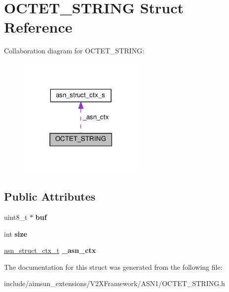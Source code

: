 \hypertarget{structOCTET__STRING}{}\section{O\+C\+T\+E\+T\+\_\+\+S\+T\+R\+I\+NG Struct Reference}
\label{structOCTET__STRING}


Collaboration diagram for O\+C\+T\+E\+T\+\_\+\+S\+T\+R\+I\+NG\+:\nopagebreak
\begin{figure}[H]
\begin{center}
\leavevmode
\includegraphics[width=174pt]{structOCTET__STRING__coll__graph}
\end{center}
\end{figure}
\subsection*{Public Attributes}
\begin{DoxyCompactItemize}
\item 
uint8\+\_\+t $\ast$ {\bfseries buf}\hypertarget{structOCTET__STRING_a38563fa0e3eaf7a3892ba84cc7333a03}{}\label{structOCTET__STRING_a38563fa0e3eaf7a3892ba84cc7333a03}

\item 
int {\bfseries size}\hypertarget{structOCTET__STRING_a08c8ec216120a4ffc21e4d5b4461c129}{}\label{structOCTET__STRING_a08c8ec216120a4ffc21e4d5b4461c129}

\item 
\hyperlink{structasn__struct__ctx__s}{asn\+\_\+struct\+\_\+ctx\+\_\+t} {\bfseries \+\_\+asn\+\_\+ctx}\hypertarget{structOCTET__STRING_a491e45278373ca1002de1fd6974190cc}{}\label{structOCTET__STRING_a491e45278373ca1002de1fd6974190cc}

\end{DoxyCompactItemize}


The documentation for this struct was generated from the following file\+:\begin{DoxyCompactItemize}
\item 
include/aimsun\+\_\+extensions/\+V2\+X\+Framework/\+A\+S\+N1/O\+C\+T\+E\+T\+\_\+\+S\+T\+R\+I\+N\+G.\+h\end{DoxyCompactItemize}
